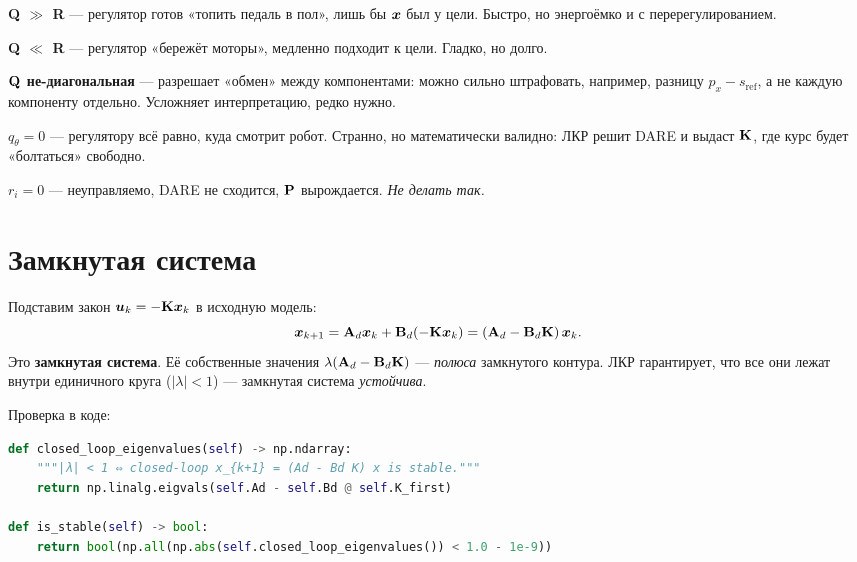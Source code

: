 \begin{whatifbox}
\textbf{Q $\gg$ R} --- регулятор готов «топить педаль в пол», лишь бы
$\bm{x}$ был у цели. Быстро, но энергоёмко и с перерегулированием.

\textbf{Q $\ll$ R} --- регулятор «бережёт моторы», медленно подходит
к цели. Гладко, но долго.

\textbf{$\mathbf{Q}$ не-диагональная} --- разрешает «обмен» между
компонентами: можно сильно штрафовать, например, разницу $p_x - s_\text{ref}$,
а не каждую компоненту отдельно. Усложняет интерпретацию, редко нужно.

\textbf{$q_\theta = 0$} --- регулятору всё равно, куда смотрит робот.
Странно, но математически валидно: ЛКР решит DARE и выдаст $\mathbf{K}$,
где курс будет «болтаться» свободно.

\textbf{$r_i = 0$} --- неуправляемо, DARE не сходится, $\mathbf{P}$
вырождается. \emph{Не делать так.}
\end{whatifbox}

\section{Замкнутая система}

\begin{ideabox}
Подставим закон $\bm{u}_k = -\mathbf{K}\bm{x}_k$ в исходную модель:
\[
  \bm{x}_{k+1} = \mathbf{A}_d\bm{x}_k + \mathbf{B}_d(-\mathbf{K}\bm{x}_k)
                 = (\mathbf{A}_d - \mathbf{B}_d\mathbf{K})\,\bm{x}_k.
\]
Это \textbf{замкнутая система}. Её собственные значения $\lambda(\mathbf{A}_d
- \mathbf{B}_d \mathbf{K})$ --- \emph{полюса} замкнутого контура. ЛКР гарантирует,
что все они лежат внутри единичного круга ($|\lambda| < 1$) --- замкнутая
система \emph{устойчива}.
\end{ideabox}

Проверка в коде:

\begin{codebox}[title={\filepath{pi\_nodes/control/mpc\_controller.py:332}}]
\begin{lstlisting}[language=Python]
def closed_loop_eigenvalues(self) -> np.ndarray:
    """|λ| < 1 ⇔ closed-loop x_{k+1} = (Ad - Bd K) x is stable."""
    return np.linalg.eigvals(self.Ad - self.Bd @ self.K_first)

def is_stable(self) -> bool:
    return bool(np.all(np.abs(self.closed_loop_eigenvalues()) < 1.0 - 1e-9))
\end{lstlisting}
\end{codebox}

